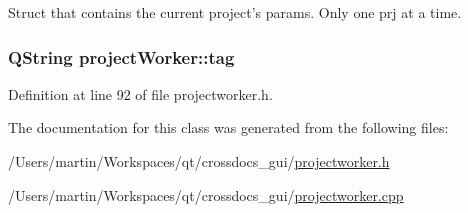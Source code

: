 Struct that contains the current project's params. Only one prj at a time. 

\hypertarget{classproject_worker_aba02c11fc0a014e1743feff1d8347ad2}{
\subsubsection[{tag}]{\setlength{\rightskip}{0pt plus 5cm}Q\+String project\+Worker\+::tag}}\label{classproject_worker_aba02c11fc0a014e1743feff1d8347ad2}


Definition at line 92 of file projectworker.\+h.



The documentation for this class was generated from the following files\+:\begin{DoxyCompactItemize}
\item 
/\+Users/martin/\+Workspaces/qt/crossdocs\+\_\+gui/\hyperlink{projectworker_8h}{projectworker.\+h}\item 
/\+Users/martin/\+Workspaces/qt/crossdocs\+\_\+gui/\hyperlink{projectworker_8cpp}{projectworker.\+cpp}\end{DoxyCompactItemize}
